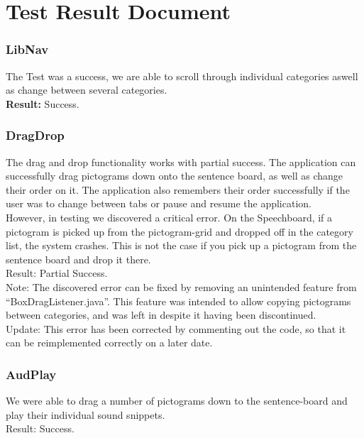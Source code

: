 \section{Test Result Document}

\subsubsection*{LibNav}
The Test was a success, we are able to scroll through individual categories aswell as change between several categories.\\

\textbf{Result:} Success.

\subsubsection*{DragDrop}
The drag and drop functionality works with partial success.
The application can successfully drag pictograms down onto the sentence board, as well as change their order on it.
The application also remembers their order successfully if the user was to change between tabs or pause and resume the application.\\

However, in testing we discovered a critical error. On the Speechboard, if a pictogram is picked up from the pictogram-grid and dropped off in the category list, the system crashes.
This is not the case if you pick up a pictogram from the sentence board and drop it there.\\

Result: Partial Success.\\

Note: The discovered error can be fixed by removing an unintended feature from ``BoxDragListener.java''. This feature was intended to allow copying pictograms between categories, and was left in despite it having been discontinued. \\

Update: This error has been corrected by commenting out the code, so that it can be reimplemented correctly on a later date.

\subsubsection*{AudPlay}
We were able to drag a number of pictograms down to the sentence-board and play their individual sound snippets.\\

Result: Success.\\

